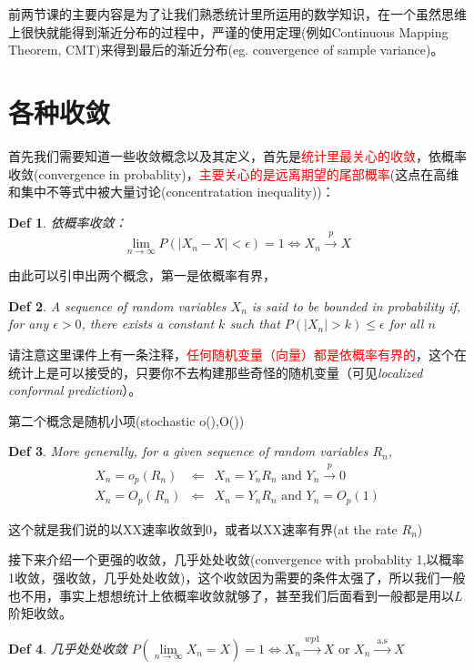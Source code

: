 \documentclass{article}
\newtheorem{defination}{Def}[section]
\begin{document}
前两节课的主要内容是为了让我们熟悉统计里所运用的数学知识，在一个虽然思维上很快就能得到渐近分布的过程中，严谨的使用定理(例如Continuous Mapping Theorem, CMT)来得到最后的渐近分布(eg. convergence of sample variance)。
\section{各种收敛}
\par 首先我们需要知道一些收敛概念以及其定义，首先是\textcolor{red}{统计里最关心的收敛}，依概率收敛(convergence in probablity)，\textcolor{red}{主要关心的是远离期望的尾部概率}(这点在高维和集中不等式中被大量讨论(concentratation inequality))：
\begin{defination}
	依概率收敛：
	\[\lim _{n \rightarrow \infty} P\left(\left|X_n-X\right|<\epsilon\right)=1\Leftrightarrow X_n \stackrel{p}{\rightarrow} X\]
\end{defination}
由此可以引申出两个概念，第一是依概率有界，
\begin{defination}
	A sequence of random variables $X_n$ is said to be bounded in probability if, for any $\epsilon>0$, there exists a constant $k$ such that $P\left(\left|X_n\right|>k\right) \leq \epsilon$ for all $n$
\end{defination}
请注意这里课件上有一条注释，\textcolor{red}{任何随机变量（向量）都是依概率有界的}，这个在统计上是可以接受的，只要你不去构建那些奇怪的随机变量（可见\textit{localized conformal prediction}）。
\par 第二个概念是随机小项(stochastic o(),O())
\begin{defination}
	More generally, for a given sequence of random variables $R_n$,
	$$
	\begin{array}{lll}
		X_n=o_p\left(R_n\right) & \Leftarrow & X_n=Y_n R_n \text { and } Y_n \stackrel{p}{\rightarrow} 0 \\
		X_n=O_p\left(R_n\right) & \Leftarrow  & X_n=Y_n R_n \text { and } Y_n=O_p(1)
	\end{array}
	$$
\end{defination}
这个就是我们说的以XX速率收敛到0，或者以XX速率有界(at the rate $R_n$)
\par 接下来介绍一个更强的收敛，几乎处处收敛(convergence with probablity 1,以概率1收敛，强收敛，几乎处处收敛)，这个收敛因为需要的条件太强了，所以我们一般也不用，事实上想想统计上依概率收敛就够了，甚至我们后面看到一般都是用以$L$阶矩收敛。
\begin{defination}
	几乎处处收敛
	$P\left(\lim\limits _{n \rightarrow \infty} X_n=X\right)=1\Leftrightarrow X_n \stackrel{w p 1}{\rightarrow} X \text { or } X_n \stackrel{\text { a.s }}{\rightarrow} X$
\end{defination}
\end{document}
